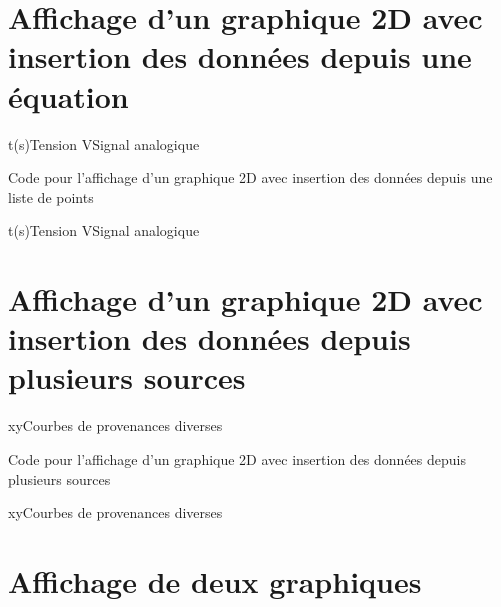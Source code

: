 \section{Affichage d'un graphique 2D avec insertion des données depuis une équation}



\begin{graphicFigure}{0.4}{0.4}{0}{3}{-1}{5}{t(s)}{Tension V}{Signal analogique}
\end{graphicFigure}

\begin{Latex}{Code pour l'affichage d'un graphique 2D avec insertion des données depuis une liste de points}
\begin{graphicFigure}{0.4}{0.4}{0}{3}{-1}{5}{t(s)}{Tension V}{Signal analogique}
\end{graphicFigure}
\end{Latex}


\section{Affichage d'un graphique 2D avec insertion des données depuis plusieurs sources}

\begin{graphic}{0.8}{0.4}{0}{20}{-1}{10}{x}{y}{Courbes de provenances diverses}
\end{graphic}

\begin{Latex}{Code pour l'affichage d'un graphique 2D avec insertion des données depuis plusieurs sources}
\begin{graphic}{0.8}{0.4}{0}{20}{-1}{10}{x}{y}{Courbes de provenances diverses}
\end{graphic}
\end{Latex}

\newpage
\section{Affichage de deux graphiques}

